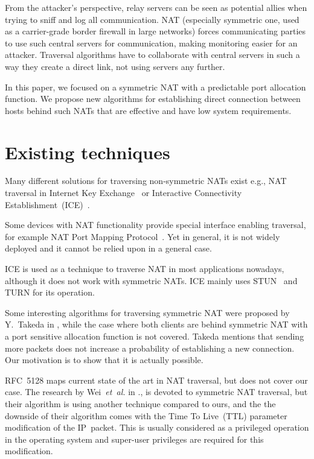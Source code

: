 \documentclass{llncs}
\newcommand{\ignore}[1]{}
\begin{document}
From the attacker's perspective, relay servers can be seen as potential allies when trying to sniff and log all 
communication. NAT (especially symmetric one, used as a carrier-grade border firewall in large networks)
forces communicating parties to use such central servers
for communication, making monitoring easier for an attacker. Traversal algorithms have to collaborate 
with central servers in such a way they create a direct link, not using servers any further. 
% 

In this paper, we focused on a symmetric NAT with a predictable port allocation function. We propose 
new algorithms for establishing direct connection between hosts behind such NATs that are effective and 
have low system requirements.

\section{Existing techniques}
Many different solutions for traversing non-symmetric NATs exist e.g., NAT traversal in Internet Key Exchange~\citep{rfc3947} or 
Interactive Connectivity Establishment~(ICE)~\citep{rfc5245}. %

Some devices with NAT functionality provide special interface enabling traversal, for example NAT Port Mapping Protocol~\citep{rfc6886}. Yet in general, it is not widely deployed and it cannot be relied upon in a general case. 

ICE\ignore{~\citep{rfc5245}} is used as a technique to traverse NAT in most applications nowadays, 
although it does not work with symmetric NATs. ICE mainly uses STUN~\citep{rfc5389} and TURN\ignore{~\citep{rfc5766}} for its operation.

Some interesting algorithms for traversing symmetric NAT were proposed by Y.~Takeda in \citep{takeda}, while the case where both clients are behind symmetric NAT
with a port sensitive allocation function is not covered. Takeda mentions that sending more packets does not increase a probability of establishing a new connection.
Our motivation is to show that it is actually possible.

RFC~5128 \citep{rfc5128} maps current state of the art in NAT traversal, but does not cover our case. 
The research by Wei~\emph{et~al.} in \citep{wei}., is devoted to symmetric NAT traversal, but their algorithm is using another technique compared to ours, and the the downside of their algorithm comes with the Time To Live~(TTL) parameter modification of the IP~packet. This is usually considered
as a privileged operation in the operating system and super-user privileges are required for this modification. 
\end{document}
